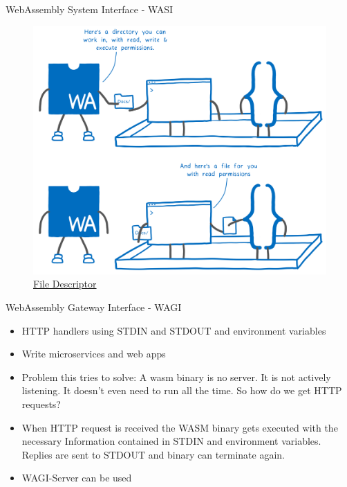 \documentclass{beamer}
\begin{document}
\begin{frame}{WebAssembly System Interface - WASI}
    \begin{figure}
        \includegraphics[scale=0.06]{./images/file.png}
        \caption{\href{https://hacks.mozilla.org/2019/03/standardizing-wasi-a-webassembly-system-interface/}{File Descriptor}}
    \end{figure}
\end{frame}

\begin{frame}{WebAssembly Gateway Interface - WAGI}
    \begin{itemize}
        \item HTTP handlers using STDIN and STDOUT and environment variables
        \item Write microservices and web apps
        \item Problem this tries to solve: A wasm binary is no server. It is not actively listening. It doesn't even need to run all the time. So how do we get HTTP requests?
        \item When HTTP request is received the WASM binary gets executed with the necessary Information contained in STDIN and environment variables. Replies are sent to STDOUT and binary can terminate again.
        \item WAGI-Server can be used
    \end{itemize}
\end{frame}
\end{document}
